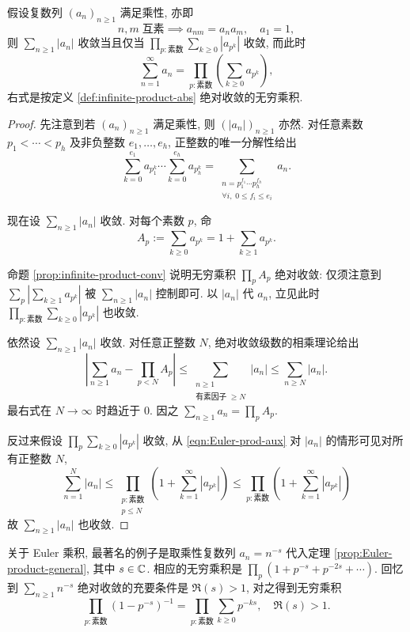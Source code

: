 \begin{theorem}[Euler 乘积]\label{prop:Euler-product-general} 
	假设复数列 $(a_n)_{n \geq 1}$ 满足乘性, 亦即
	\[ n, m \;\text{互素} \implies a_{nm} = a_n a_m, \quad a_1 = 1, \]
	则 $\sum_{n \geq 1} |a_n|$ 收敛当且仅当 $\prod_{p: \text{素数}} \sum_{k \geq 0} |a_{p^k}|$ 收敛, 而此时
	\[ \sum_{n=1}^\infty a_n =  \prod_{p: \text{素数}} \left( \sum_{k \geq 0} a_{p^k} \right), \]
	右式是按定义 \ref{def:infinite-product-abs} 绝对收敛的无穷乘积.
\end{theorem}
\begin{proof}
	先注意到若 $(a_n)_{n \geq 1}$ 满足乘性, 则 $(|a_n|)_{n \geq 1}$ 亦然. 对任意素数 $p_1 < \cdots < p_h$ 及非负整数 $e_1, \ldots, e_h$, 正整数的唯一分解性给出
	\begin{equation}\label{eqn:Euler-prod-aux}
		\sum_{k=0}^{e_1} a_{p_1^k} \cdots \sum_{k=0}^{e_h} a_{p_h^k}
		= \sum_{\substack{n = p_1^{f_1} \cdots p_h^{f_h} \\ \forall i,\; 0 \leq f_i \leq e_i }} a_n.
	\end{equation}
	
	现在设 $\sum_{n \geq 1} |a_n|$ 收敛. 对每个素数 $p$, 命
	\[ A_p := \sum_{k \geq 0} a_{p^k} = 1 + \sum_{k \geq 1} a_{p^k}. \]
	
	命题 \ref{prop:infinite-product-conv} 说明无穷乘积 $\prod_p A_p$ 绝对收敛: 仅须注意到 $\sum_p \left| \sum_{k \geq 1} a_{p^k} \right|$ 被 $\sum_{n \geq 1} |a_n|$ 控制即可. 以 $|a_n|$ 代 $a_n$, 立见此时 $\prod_{p: \text{素数}} \sum_{k \geq 0} |a_{p^k}|$ 也收敛.

	依然设 $\sum_{n \geq 1} |a_n|$ 收敛. 对任意正整数 $N$, 绝对收敛级数的相乘理论给出
	\[ \left| \sum_{n \geq 1} a_n - \prod_{p < N} A_p \right| \leq \sum_{\substack{n \geq 1 \\ \text{有素因子}\; \geq N}} |a_n| \leq \sum_{n \geq N} |a_n|. \]
	最右式在 $N \to \infty$ 时趋近于 $0$. 因之 $\sum_{n \geq 1} a_n = \prod_p A_p$.
	
	反过来假设 $\prod_p \sum_{k \geq 0} |a_{p^k}|$ 收敛, 从 \eqref{eqn:Euler-prod-aux} 对 $|a_n|$ 的情形可见对所有正整数 $N$,
	\[ \sum_{n=1}^N |a_n| \leq \prod_{\substack{p: \text{素数} \\ p \leq N}} \left( 1 + \sum_{k=1}^\infty |a_{p^k}| \right) \leq \prod_{p: \text{素数}} \left( 1 + \sum_{k=1}^\infty |a_{p^k}| \right) \]
	故 $\sum_{n \geq 1} |a_n|$ 也收敛.
\end{proof}

关于 Euler 乘积, 最著名的例子是取乘性复数列 $a_n = n^{-s}$ 代入定理 \ref{prop:Euler-product-general}, 其中 $s \in \mathbb{C}$. 相应的无穷乘积是 $\prod_p (1 + p^{-s} + p^{-2s} + \cdots)$. 回忆到 $\sum_{n \geq 1} n^{-s}$ 绝对收敛的充要条件是 $\Re(s) > 1$, 对之得到无穷乘积
\[ \prod_{p: \text{素数}} \left( 1 - p^{-s} \right)^{-1} = \prod_{p: \text{素数}} \sum_{k \geq 0} p^{-ks}, \quad \Re(s) > 1. \]

